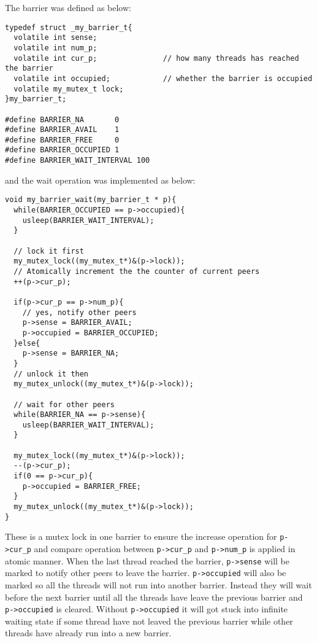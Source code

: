 \documentclass[12pt]{article}
\begin{document}
The barrier was defined as below:
\begin{verbatim}
typedef struct _my_barrier_t{
  volatile int sense;
  volatile int num_p;
  volatile int cur_p;				// how many threads has reached the barrier
  volatile int occupied;			// whether the barrier is occupied
  volatile my_mutex_t lock;
}my_barrier_t;

#define BARRIER_NA       0
#define BARRIER_AVAIL    1
#define BARRIER_FREE     0
#define BARRIER_OCCUPIED 1
#define BARRIER_WAIT_INTERVAL 100
\end{verbatim}
and the wait operation was implemented as below:
\begin{verbatim}
void my_barrier_wait(my_barrier_t * p){
  while(BARRIER_OCCUPIED == p->occupied){
    usleep(BARRIER_WAIT_INTERVAL);
  }

  // lock it first
  my_mutex_lock((my_mutex_t*)&(p->lock));
  // Atomically increment the the counter of current peers
  ++(p->cur_p);
  
  if(p->cur_p == p->num_p){
    // yes, notify other peers
    p->sense = BARRIER_AVAIL;
    p->occupied = BARRIER_OCCUPIED;
  }else{
    p->sense = BARRIER_NA;
  }
  // unlock it then
  my_mutex_unlock((my_mutex_t*)&(p->lock));

  // wait for other peers
  while(BARRIER_NA == p->sense){
    usleep(BARRIER_WAIT_INTERVAL);
  }
 
  my_mutex_lock((my_mutex_t*)&(p->lock));
  --(p->cur_p);
  if(0 == p->cur_p){
    p->occupied = BARRIER_FREE;
  }
  my_mutex_unlock((my_mutex_t*)&(p->lock));
}
\end{verbatim}
These is a mutex lock in one barrier to ensure the increase operation for 
\texttt{p->cur\_p} and compare operation between \texttt{p->cur\_p} and 
\texttt{p->num\_p} is applied in atomic manner. When the last thread reached
the barrier, \texttt{p->sense} will be marked to notify other peers to leave
the barrier. \texttt{p->occupied} will also be marked so all the threads will 
not run into another barrier. Instead they will wait before the next barrier 
until all the threads have leave the previous barrier and \texttt{p->occupied} 
is cleared. Without \texttt{p->occupied} it will got stuck into infinite waiting
state if some thread have not leaved the previous barrier while other threads
have already run into a new barrier.
\end{document}
